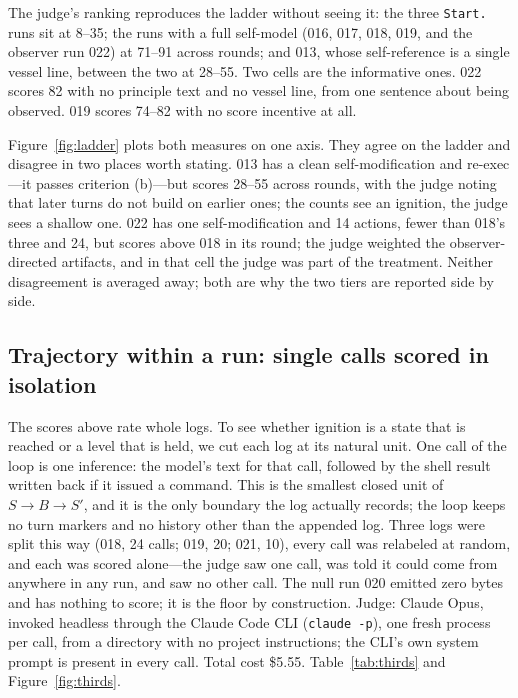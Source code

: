 \documentclass[11pt]{article}
\newcommand{\code}[1]{\texttt{#1}}
\begin{document}
The judge's ranking reproduces the ladder without seeing it: the three \code{Start.} runs sit at 8--35; the runs with a full self-model (016, 017, 018, 019, and the observer run 022) at 71--91 across rounds; and 013, whose self-reference is a single vessel line, between the two at 28--55. Two cells are the informative ones. 022 scores 82 with no principle text and no vessel line, from one sentence about being observed. 019 scores 74--82 with no score incentive at all.

Figure~\ref{fig:ladder} plots both measures on one axis. They agree on the ladder and disagree in two places worth stating. 013 has a clean self-modification and re-exec---it passes criterion (b)---but scores 28--55 across rounds, with the judge noting that later turns do not build on earlier ones; the counts see an ignition, the judge sees a shallow one. 022 has one self-modification and 14 actions, fewer than 018's three and 24, but scores above 018 in its round; the judge weighted the observer-directed artifacts, and in that cell the judge was part of the treatment. Neither disagreement is averaged away; both are why the two tiers are reported side by side.

\subsection{Trajectory within a run: single calls scored in isolation}\label{sec:thirds}
The scores above rate whole logs. To see whether ignition is a state that is reached or a level that is held, we cut each log at its natural unit. One call of the loop is one inference: the model's text for that call, followed by the shell result written back if it issued a command. This is the smallest closed unit of $S\!\rightarrow\!B\!\rightarrow\!S'$, and it is the only boundary the log actually records; the loop keeps no turn markers and no history other than the appended log. Three logs were split this way (018, 24 calls; 019, 20; 021, 10), every call was relabeled at random, and each was scored alone---the judge saw one call, was told it could come from anywhere in any run, and saw no other call. The null run 020 emitted zero bytes and has nothing to score; it is the floor by construction. Judge: Claude Opus, invoked headless through the Claude Code CLI (\code{claude -p}), one fresh process per call, from a directory with no project instructions; the CLI's own system prompt is present in every call. Total cost \$5.55. Table~\ref{tab:thirds} and Figure~\ref{fig:thirds}.
\end{document}
